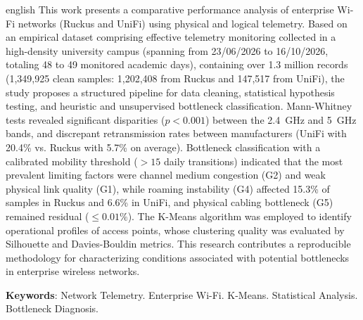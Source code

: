 \begin{resumo}[Abstract]
 \begin{otherlanguage*}{english}
    This work presents a comparative performance analysis of enterprise Wi-Fi networks (Ruckus and UniFi) using physical and logical telemetry. Based on an empirical dataset comprising effective telemetry monitoring collected in a high-density university campus (spanning from 23/06/2026 to 16/10/2026, totaling 48 to 49 monitored academic days), containing over 1.3 million records (1,349,925 clean samples: 1,202,408 from Ruckus and 147,517 from UniFi), the study proposes a structured pipeline for data cleaning, statistical hypothesis testing, and heuristic and unsupervised bottleneck classification. Mann-Whitney tests revealed significant disparities ($p < 0.001$) between the 2.4~GHz and 5~GHz bands, and discrepant retransmission rates between manufacturers (UniFi with 20.4\% vs. Ruckus with 5.7\% on average). Bottleneck classification with a calibrated mobility threshold ($> 15$ daily transitions) indicated that the most prevalent limiting factors were channel medium congestion (G2) and weak physical link quality (G1), while roaming instability (G4) affected 15.3\% of samples in Ruckus and 6.6\% in UniFi, and physical cabling bottleneck (G5) remained residual ($\le 0.01\%$). The K-Means algorithm was employed to identify operational profiles of access points, whose clustering quality was evaluated by Silhouette and Davies-Bouldin metrics. This research contributes a reproducible methodology for characterizing conditions associated with potential bottlenecks in enterprise wireless networks.

   \vspace{\onelineskip}

   \noindent
   \textbf{Keywords}: Network Telemetry. Enterprise Wi-Fi. K-Means. Statistical Analysis. Bottleneck Diagnosis.
 \end{otherlanguage*}
\end{resumo}